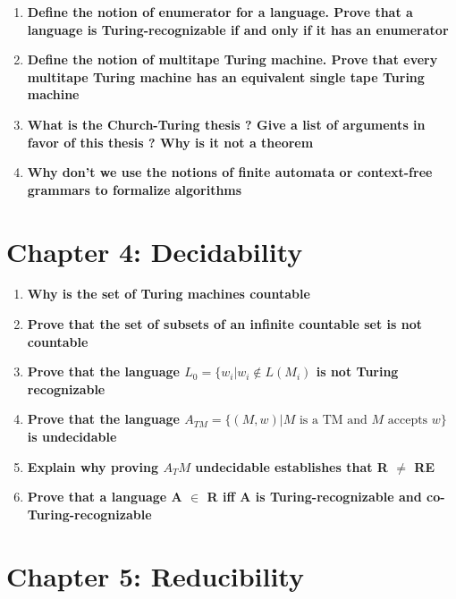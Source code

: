 \documentclass{article}
\begin{document}
\begin{enumerate}
\item \textbf{Define the notion of enumerator for a language. Prove that a language is Turing-recognizable if and only if it has an enumerator}

\item \textbf{Define the notion of multitape Turing machine. Prove that every multitape Turing machine has an equivalent single tape Turing machine}

\item \textbf{What is the Church-Turing thesis ? Give a list of arguments in favor of this thesis ? Why is it not a theorem}

\item \textbf{Why don’t we use the notions of finite automata or context-free grammars to formalize algorithms} 
\end{enumerate}



\clearpage
\section{Chapter 4: Decidability}

\begin{enumerate}
\item \textbf{Why is the set of Turing machines countable} 

\item \textbf{Prove that the set of subsets of an infinite countable set is not countable}

\item \textbf{Prove that the language $L_0 = \{ w_i | w_i \notin L(M_i)$ is not Turing recognizable}

\item \textbf{Prove that the language $A_{TM} = \{(M, w) | M \text{ is a TM and } M \text{ accepts } w\}$ is undecidable}

\item \textbf{Explain why proving $A_TM$ undecidable establishes that R $\neq$ RE}

\item \textbf{Prove that a language A $\in$ R iff A is Turing-recognizable and co-Turing-recognizable}

\end{enumerate}

\clearpage
\section{Chapter 5: Reducibility}
\end{document}
